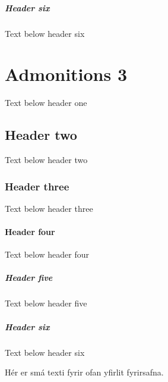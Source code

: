 \documentclass[a4paper,10pt,icelandic]{sphinxmanual}
\begin{document}
\subparagraph{Header six}
\label{\detokenize{admonitions/admonitions-2/index:header-six}}
\sphinxAtStartPar
Text below header six

\sphinxstepscope


\section{Admonitions 3}
\label{\detokenize{admonitions/admonitions-3/index:admonitions-3}}\label{\detokenize{admonitions/admonitions-3/index::doc}}
\sphinxAtStartPar
Text below header one


\subsection{Header two}
\label{\detokenize{admonitions/admonitions-3/index:header-two}}
\sphinxAtStartPar
Text below header two


\subsubsection{Header three}
\label{\detokenize{admonitions/admonitions-3/index:header-three}}
\sphinxAtStartPar
Text below header three


\paragraph{Header four}
\label{\detokenize{admonitions/admonitions-3/index:header-four}}
\sphinxAtStartPar
Text below header four


\subparagraph{Header five}
\label{\detokenize{admonitions/admonitions-3/index:header-five}}
\sphinxAtStartPar
Text below header five


\subparagraph{Header six}
\label{\detokenize{admonitions/admonitions-3/index:header-six}}
\sphinxAtStartPar
Text below header six

\sphinxAtStartPar
Hér er smá texti fyrir ofan yfirlit fyrirsafna.
\end{document}

